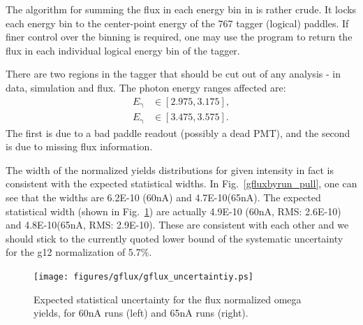 The algorithm for summing the flux in each energy bin in  is rather crude. It locks each energy bin to the center-point energy of the 767 tagger (logical) paddles. If finer control over the binning is required, one may use the  program to return the flux in each individual logical energy bin of the tagger.

There are two regions in the tagger that should be cut out of any analysis - in data, simulation and flux. The photon energy ranges affected are:
\begin{eqnarray}
    E_\text{γ} &\in [2.975,3.175], \\ \nonumber
    E_\text{γ} &\in [3.475,3.575].
\end{eqnarray}
The first is due to a bad paddle readout (possibly a dead PMT), and the second is due to missing flux information.

The width of the normalized yields distributions for given intensity in fact is consistent with the expected statistical widths. In Fig.~\ref{gfluxbyrun_pull}, one can see that the widths are 6.2E-10 (60nA) and 4.7E-10(65nA). The expected statistical width (shown in Fig.~\ref{gfluxbyrun_uncertain}) are actually 4.9E-10 (60nA, RMS: 2.6E-10) and 4.8E-10(65nA, RMS: 2.9E-10). These are consistent with each other and we should stick to the currently quoted lower bound of the systematic uncertainty for the g12 normalization of 5.7\%. 
\begin{figure}[htpb]
	\begin{center}
		\texttt{[image: figures/gflux/gflux\_uncertaintiy.ps]}
		\caption{Expected statistical uncertainty for the flux normalized omega yields, for 60nA runs (left) and 65nA runs (right).}
		\label{gfluxbyrun_uncertain}
	\end{center}
\end{figure}
\FloatBarrier
